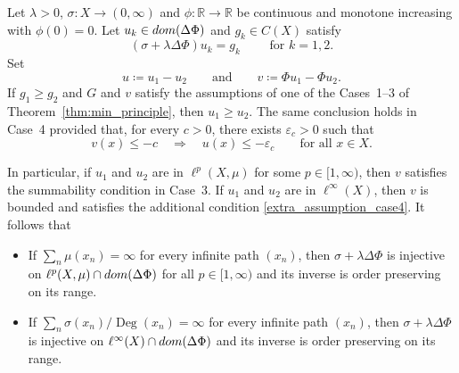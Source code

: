 \documentclass[10pt,a4paper]{amsart}
\newcommand{\Deg}{\operatorname{Deg}}
\newcommand{\R}{\mathbb{R}}
\newcommand{\dom}{\textnormal{dom}} %
\begin{document}
\begin{theorem}\label{thm:min}
Let $\lambda>0$, $\sigma \colon X \to (0, \infty)$ and { $\phi\colon\R\to\R$ be continuous and monotone increasing with $\phi(0)=0$}. 
Let $u_k \in \dom(\Delta \Phi)$ and  $g_k \in C(X)$ satisfy
	$$
	\left(\sigma + \lambda\Delta \Phi \right) u_k = g_k \qquad \mbox{ for } k=1,2.
	$$
{ Set
\[
 u\coloneqq u_1-u_2
 \qquad \text{and} \qquad
 v\coloneqq \Phi u_1-\Phi u_2.
\]
If $g_1\geq g_2$ and $G$ and $v$ satisfy the assumptions of one of the Cases~1--3 of
Theorem~\ref{thm:min_principle}, then
$u_1\geq u_2$. The same conclusion holds in Case~4 provided that, for 
every $c>0$, there exists $\varepsilon_c>0$ such that
\begin{equation}\label{extra_assumption_case4}
 v(x)\leq-c
 \quad\Longrightarrow\quad
 u(x)\leq-\varepsilon_c \qquad \text{for all } x \in X.
\end{equation}} 

In particular, if  $u_1$ and  $u_2$ are in $\ell^p(X,\mu)$ for some $p \in [1,\infty)$, then { $v$ satisfies the summability condition in
Case~3}. 
If $u_1$ and $u_2$ are in $\ell^\infty(X)$, { then $v$ is bounded and satisfies
the additional condition \eqref{extra_assumption_case4}}.
It follows that 
\begin{itemize}
\item[\textup{(i)}] If $\sum_n \mu(x_n)=\infty$ for every infinite path $(x_n)$, then
$\sigma + \lambda\Delta \Phi$ is injective on $\ell^p(X,\mu) \cap \dom(\Delta \Phi)$
for all $p\in[1,\infty)$ { and its inverse is order preserving on its range}. 
\item[\textup{(ii)}] If $\sum_{n} \sigma(x_n)/\Deg(x_{n})=\infty$ for every infinite path $(x_n)$,
then $\sigma + \lambda\Delta \Phi$ is injective on
{ $\ell^\infty(X)\cap\dom(\Delta\Phi)$ and its inverse is order preserving on its range}.
\end{itemize}

\end{theorem}
\end{document}
